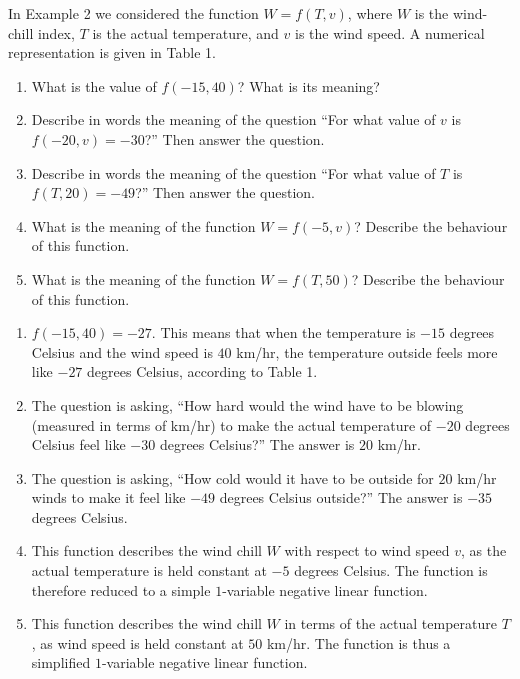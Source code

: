 \begin{exercise}
	In Example 2 we considered the function $W = f\left( T, v \right)$, where $W$ is the wind-chill index, $T$ is the actual temperature, and $v$ is the wind speed. A numerical representation is given in Table 1.
	\renewcommand{\labelenumi}{(\alph{enumi})}
	\begin{enumerate}
		\item What is the value of $f\left(-15,40\right)$? What is its meaning?
		\item Describe in words the meaning of the question ``For what value of $v$ is $f\left(-20,v\right)=-30$?'' Then answer the question.
		\item Describe in words the meaning of the question ``For what value of $T$ is $f\left(T,20\right)=-49$?'' Then answer the question.
		\item What is the meaning of the function $W = f\left(-5,v\right)$? Describe the behaviour of this function.
		\item What is the meaning of the function $W = f\left(T,50\right)$? Describe the behaviour of this function.
	\end{enumerate}
\end{exercise}
\begin{solution}
	{\color{white}{content...}}
	\renewcommand{\labelenumi}{(\alph{enumi})}
	\begin{enumerate}
		\item $f\left(-15,40\right) = -27$. This means that when the temperature is $-15$ degrees Celsius and the wind speed is $40$ km/hr, the temperature outside feels more like $-27$ degrees Celsius, according to Table 1.
		\item The question is asking, ``How hard would the wind have to be blowing (measured in terms of km/hr) to make the actual temperature of $-20$ degrees Celsius feel like $-30$ degrees Celsius?'' The answer is $20$ km/hr.
		\item The question is asking, ``How cold would it have to be outside for $20$ km/hr winds to make it feel like $-49$ degrees Celsius outside?'' The answer is $-35$ degrees Celsius.
		\item This function describes the wind chill $W$ with respect to wind speed $v$, as the actual temperature is held constant at $-5$ degrees Celsius. The function is therefore reduced to a simple $1$-variable negative linear function.
		\item This function describes the wind chill $W$ in terms of the actual temperature $T$, as wind speed is held constant at $50$ km/hr. The function is thus a simplified $1$-variable negative linear function.
	\end{enumerate}
\end{solution}
